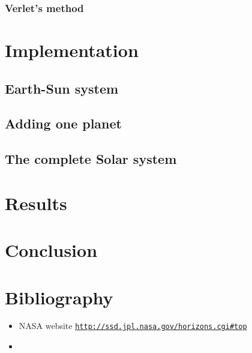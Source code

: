 \documentclass[a4paper, twoside, 11pt]{report}
\theoremstyle{theorem}
\theoremstyle{remark}
\theoremstyle{exemple}
\begin{document}
        \subsection{Verlet's method}

\chapter{Implementation}

    \section{Earth-Sun system}
        \paragraph{}
    
    \section{Adding one planet}
    
    
    \section{The complete Solar system}
    
    

\chapter{Results}

    \section{}
    
    \section{}
    
    \section{}
    
    

\chapter*{Conclusion}

    \paragraph{}
    
    
    
    
\chapter*{Bibliography}
    \begin{itemize}
        \item NASA website \href{{http://ssd.jpl.nasa.gov/horizons.cgi#top}}{\nolinkurl{http://ssd.jpl.nasa.gov/horizons.cgi\#top}}
        \item 
    \end{itemize}
    
    
    
    
    
    
    
    
    
    
\end{document}
